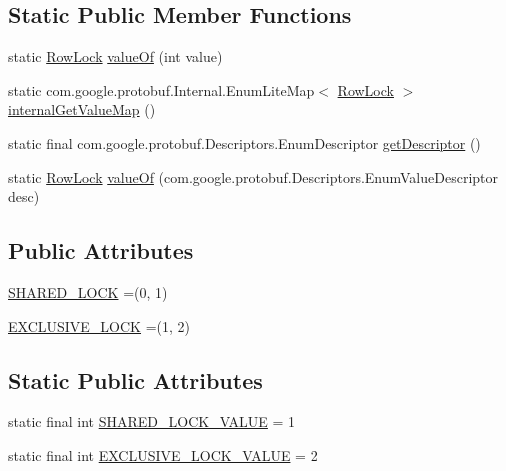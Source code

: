 \subsection*{Static Public Member Functions}
\begin{DoxyCompactItemize}
\item 
static \mbox{\hyperlink{enumcom_1_1mysql_1_1cj_1_1x_1_1protobuf_1_1_mysqlx_crud_1_1_find_1_1_row_lock}{Row\+Lock}} \mbox{\hyperlink{enumcom_1_1mysql_1_1cj_1_1x_1_1protobuf_1_1_mysqlx_crud_1_1_find_1_1_row_lock_ab9529e6c923fb78e3cee52f3845de864}{value\+Of}} (int value)
\item 
static com.\+google.\+protobuf.\+Internal.\+Enum\+Lite\+Map$<$ \mbox{\hyperlink{enumcom_1_1mysql_1_1cj_1_1x_1_1protobuf_1_1_mysqlx_crud_1_1_find_1_1_row_lock}{Row\+Lock}} $>$ \mbox{\hyperlink{enumcom_1_1mysql_1_1cj_1_1x_1_1protobuf_1_1_mysqlx_crud_1_1_find_1_1_row_lock_a435305edcec293f5df5df81fe544b4d5}{internal\+Get\+Value\+Map}} ()
\item 
static final com.\+google.\+protobuf.\+Descriptors.\+Enum\+Descriptor \mbox{\hyperlink{enumcom_1_1mysql_1_1cj_1_1x_1_1protobuf_1_1_mysqlx_crud_1_1_find_1_1_row_lock_a1abfd70f50e5dfb2e668e65b48b55dfd}{get\+Descriptor}} ()
\item 
static \mbox{\hyperlink{enumcom_1_1mysql_1_1cj_1_1x_1_1protobuf_1_1_mysqlx_crud_1_1_find_1_1_row_lock}{Row\+Lock}} \mbox{\hyperlink{enumcom_1_1mysql_1_1cj_1_1x_1_1protobuf_1_1_mysqlx_crud_1_1_find_1_1_row_lock_ae8ed3e6cd9364e68ca360d0c35c4968c}{value\+Of}} (com.\+google.\+protobuf.\+Descriptors.\+Enum\+Value\+Descriptor desc)
\end{DoxyCompactItemize}
\subsection*{Public Attributes}
\begin{DoxyCompactItemize}
\item 
\mbox{\hyperlink{enumcom_1_1mysql_1_1cj_1_1x_1_1protobuf_1_1_mysqlx_crud_1_1_find_1_1_row_lock_a7754006183dbdf7671396a2ddec6e74b}{S\+H\+A\+R\+E\+D\+\_\+\+L\+O\+CK}} =(0, 1)
\item 
\mbox{\hyperlink{enumcom_1_1mysql_1_1cj_1_1x_1_1protobuf_1_1_mysqlx_crud_1_1_find_1_1_row_lock_ac7bfbc64e9102fffbaccd2c09fdff117}{E\+X\+C\+L\+U\+S\+I\+V\+E\+\_\+\+L\+O\+CK}} =(1, 2)
\end{DoxyCompactItemize}
\subsection*{Static Public Attributes}
\begin{DoxyCompactItemize}
\item 
static final int \mbox{\hyperlink{enumcom_1_1mysql_1_1cj_1_1x_1_1protobuf_1_1_mysqlx_crud_1_1_find_1_1_row_lock_a9b593ba176e2c6d30e800321555455ca}{S\+H\+A\+R\+E\+D\+\_\+\+L\+O\+C\+K\+\_\+\+V\+A\+L\+UE}} = 1
\item 
static final int \mbox{\hyperlink{enumcom_1_1mysql_1_1cj_1_1x_1_1protobuf_1_1_mysqlx_crud_1_1_find_1_1_row_lock_a907b6abaea0ec579d241d16f904254cb}{E\+X\+C\+L\+U\+S\+I\+V\+E\+\_\+\+L\+O\+C\+K\+\_\+\+V\+A\+L\+UE}} = 2
\end{DoxyCompactItemize}


